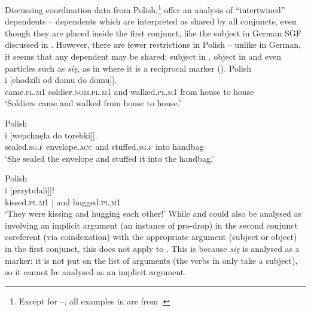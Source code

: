 \documentclass[output=paper]{../langscibook}
\begin{document}
Discussing coordination data from Polish,\footnote{Except for –,
  all examples in  are from \citet{PatejukPrzepiorkowski2015}.} \citet{PatejukPrzepiorkowski2015} offer
an analysis of ``intertwined'' dependents – dependents which are
interpreted as shared by all conjuncts, even though they are placed
inside the first conjunct, like the subject in German SGF
discussed in . However, there are fewer restrictions in Polish –
unlike in German, it seems that any dependent may be shared: subject
in , object in
 and even particles such as \emph{się}, as
in  where it is a reciprocal marker ({\RECP}).
\ea\label{ex:cstr:pat:prz:15:61}
    Polish\\\gll
      [[Przyjechali żandarmi] i [chodzili od domu do domu]]. \\
      \phtm{[[}came.\textsc{pl.m1} soldier.\textsc{nom.pl.m1} and \phtm{[}walked.\textsc{pl.m1} from house to house\\
\glt`Soldiers came and walked from house to house.'\nkjp
\newpage
  \item\label{ex:cstr:pat:prz:15:62}
    Polish\\\gll
      [[Zakleiła kopertę] i [wepchnęła do torebki]]. \\
      \phtm{[[}sealed.\textsc{sg.f} envelope.\textsc{acc} and \phtm{[}stuffed.\textsc{sg.f} into handbag\\
\glt`She sealed the envelope and stuffed it into the handbag.'\nkjp
%
  \item\label{ex:cstr:pat:prz:15:32}
  Polish\\\gll
    [[Całowali się] i [przytulali]]! \\
    \phtm{[[}kissed.\textsc{pl.m1} {\RECP}$\vert${\RECP} and \phtm{[}hugged.\textsc{pl.m1}\\
\glt`They were kissing and hugging each other!'\ggl
\z
While  and 
could also be analysed as involving an implicit argument (an
instance of pro-drop) in the second conjunct coreferent (via
coindexation) with the appropriate argument (subject or object) in the
first conjunct, this does not apply to
. This is because \emph{się}
is analysed as a marker: it is not put on the list of arguments (the
verbs in  only take a subject), so it
cannot be analysed as an implicit argument.
\end{document}
